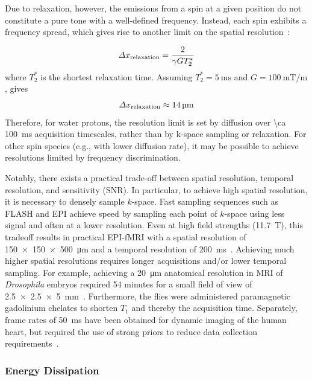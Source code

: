 Due to relaxation, however, the emissions from a spin at a given position do not constitute a pure tone with a well-defined frequency. Instead, each spin exhibits a frequency spread, which gives rise to another limit on the spatial resolution~\cite{glover02}:

\[\Delta x_{\text{\scriptsize relaxation}} = \frac{2}{\gamma G T_2^*}\]
where $T_2^*$ is the shortest relaxation time. Assuming $T_2^*=\SI{5}{\milli\second}$ and $G=\SI{100}{\milli\tesla\per\meter}$, gives
\[\Delta x_{\text{\scriptsize relaxation}}\approx \SI{14}{\micro\meter}\]
Therefore, for water protons, the resolution limit is set by diffusion over \SI{\ca 100}{\milli\second} acquisition timescales, rather than by k-space sampling or relaxation. For other spin species (e.g., with lower diffusion rate), it may be possible to achieve resolutions limited by frequency discrimination.

Notably, there exists a practical trade-off between spatial resolution, temporal resolution, and sensitivity (SNR). In particular, to achieve high spatial resolution, it is necessary to densely sample $k$-space.
Fast sampling sequences such as FLASH and EPI achieve speed by sampling each point of $k$-space using less signal and often at a lower resolution.
Even at high field strengths (\SI{11.7}{\tesla}), this tradeoff results in practical EPI-fMRI with a spatial resolution of \SI{150 x 150 x 500}{\micro\meter} and a temporal resolution of \SI{200}{\milli\second}~\cite{yu12}.
Achieving much higher spatial resolutions requires longer acquisitions and/or lower temporal sampling.
For example, achieving a \SI{20}{\micro\meter} anatomical resolution in MRI of \emph{Drosophila} embryos required 54 minutes for a small field of view of \SI{2.5 x 2.5 x 5}{\milli\meter}~\cite{null08}.
Furthermore, the flies were administered paramagnetic gadolinium chelates to shorten $T_1$ and thereby the acquisition time.
Separately, frame rates of \SI{50}{\milli\second} have been obtained for dynamic imaging of the human heart, but required the use of strong priors to reduce data collection requirements~\cite{zhang10}.

\subsubsection{Energy Dissipation}

